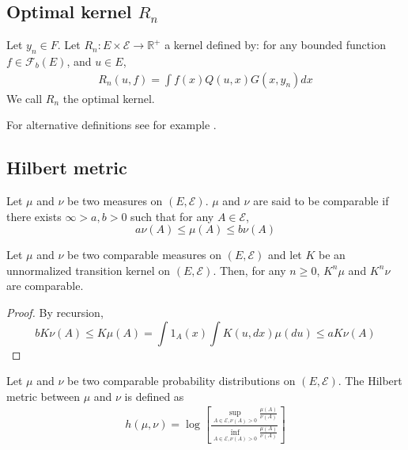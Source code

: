 \subsection{Optimal kernel $R_n$}\label{sec:optimal_kernel_appendix}

\begin{definition}
Let $y_n \in F$.
Let $R_n : E \times \mathcal E \to \mathbb R^+$ a kernel defined by:
    for any bounded function $f\in\mathcal F_b(E)$, and $u\in E$,
    \begin{align}
        R_n(u, f) = \int f(x)Q(u, x)G(x, y_n)dx
    \end{align}
We call $R_n$ the optimal kernel.
\end{definition}
For alternative definitions see for example \citealp[page 220]{cappehmm}.


\subsection{Hilbert metric}

\begin{definition} Let $\mu$ and $\nu$ be two measures on $(E, \mathcal E)$. $\mu$ and $\nu$ are said to be comparable if there exists $\infty > a, b >0$ such that for any $A\in \mathcal E$,
\begin{equation}
    a\nu(A) \leq \mu(A) \leq b\nu(A)
\end{equation}
\end{definition}

\begin{proposition}
Let $\mu$ and $\nu$ be two comparable measures on $(E, \mathcal E)$ and let $K$ be an unnormalized transition kernel on $(E, \mathcal E)$. Then, for any $n\geq 0$, $K^n\mu$ and $K^n\nu$ are comparable.
\end{proposition}

\begin{proof} By recursion,
    \begin{equation}
        bK\nu(A) \leq K\mu(A) = \int 1_A(x) \int K(u, dx)\mu(du) \leq aK\nu(A)
    \end{equation}
\end{proof}

\begin{definition}
   Let $\mu$ and $\nu$ be two comparable probability distributions on $(E, \mathcal E)$. The Hilbert metric between $\mu$ and $\nu$ is defined as
\begin{align}
    h(\mu, \nu) = \log\left[\frac{\sup_{A\in\mathcal E, \nu(A)>0} \frac{\mu(A)}{\nu(A)}}{\inf_{A\in \mathcal E, \nu(A) > 0}\frac{\mu(A)}{\nu(A)}}\right]
\end{align}
\end{definition}

